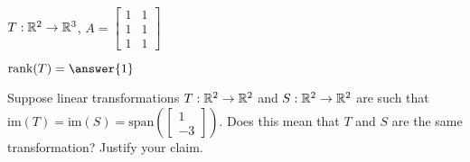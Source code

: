 \documentclass{ximera}
\author{Zack Reed}
\begin{document}
\begin{problem}\label{prob:imagerankoflintrans2}
    $T:\mathbb{R}^2\rightarrow\mathbb{R}^3$, $A=\begin{bmatrix}1&1\\1&1\\1&1\end{bmatrix}$
      
    \begin{multipleChoice}
    \end{multipleChoice}
      
    $\mbox{rank}(T)=\answer{1}$
    \end{problem}
    
     
     
    \begin{problem}\label{prob:sametrans} Suppose linear transformations $T:\mathbb{R}^2\rightarrow \mathbb{R}^2$ and $S:\mathbb{R}^2\rightarrow \mathbb{R}^2$ are such that  $\mbox{im}(T)=\mbox{im}(S)=\mbox{span}\left(\begin{bmatrix}1\\-3\end{bmatrix}\right)$.  Does this mean that $T$ and $S$ are the same transformation?  Justify your claim.
    \end{problem}
     
\end{document}
